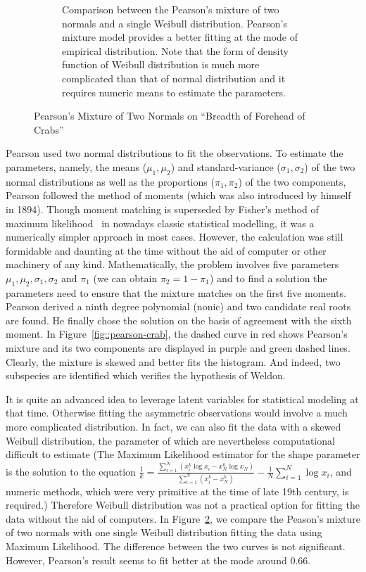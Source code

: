 \begin{figure}[ht!]
\begin{subfigure}[b]{0.95\textwidth}
  \caption{Comparison between the Pearson's mixture of two normals and a single
  Weibull distribution. Pearson's mixture model provides a better fitting at the
  mode of empirical distribution. Note that the form of density function of
  Weibull distribution is much more complicated than that of normal distribution
  and it requires numeric means to estimate the parameters.}
  \label{fig::pearson-crab-weibull}
  \end{subfigure}
  \caption{Pearson's Mixture of Two Normals on ``Breadth of Forehead of Crabs''}
\end{figure}

Pearson used two normal distributions to fit the observations. To estimate the
parameters, namely, the means ($\mu_1, \mu_2$) and standard-variance ($\sigma_1,
\sigma_2$) of the two normal distributions as well as the proportions ($\pi_1,
\pi_2$) of the two components, Pearson followed the method of moments (which
was also introduced by himself in 1894). Though moment matching is superseded
by Fisher's method of maximum likelihood~\cite{pfanzagl1994parametric} in
nowadays classic statistical modelling, it was a numerically simpler approach
in most cases. However, the calculation was still formidable and daunting at
the time without the aid of computer or other machinery of any kind.
Mathematically, the problem involves five parameters $\mu_1, \mu_2, \sigma_1,
\sigma_2$ and $\pi_1$ (we can obtain $\pi_2 = 1 - \pi_1$) and to find a
solution the parameters need to ensure that the mixture matches on the first
five moments. Pearson derived a ninth degree polynomial (nonic) and two
candidate real roots are found. He finally chose the solution on the basis of
agreement with the sixth moment. In Figure~\ref{fig::pearson-crab}, the dashed
curve in red shows Pearson's mixture and its two components are displayed in
purple and green dashed lines. Clearly, the mixture is skewed and better fits
the histogram. And indeed, two subspecies are identified which verifies the
hypothesis of Weldon.

It is quite an advanced idea to leverage latent variables for statistical
modeling at that time. Otherwise fitting the asymmetric observations would
involve a much more complicated distribution. In fact, we can also fit the data
with a skewed Weibull distribution, the parameter of which are nevertheless
computational difficult to estimate (The Maximum Likelihood estimator for the
shape parameter is the solution to the equation $\frac{1}{k} =
\frac{\sum_{i=1}^N (x_i^k\log x_i - x_N^k \log x_N) }{\sum_{i=1}^N (x_i^k -
x_N^k)}- \frac{1}{N}\sum\limits_{i=1}^N \log x_i$, and numeric methods, which
were very primitive at the time of late 19th century, is required.) Therefore
Weibull distribution was not a practical option for fitting the data without the
aid of computers. In Figure~\ref{fig::pearson-crab-weibull}, we compare the
Peason's mixture of two normals with one single Weibull distribution fitting the
data using Maximum Likelihood. The difference between the two curves is not
significant. However, Pearson's result seems to fit better at the mode around
$0.66$.

